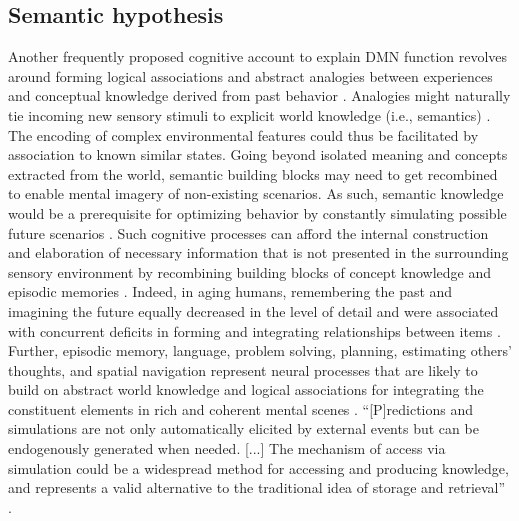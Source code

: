 \documentclass[10pt,letterpaper]{article}
\begin{document}
\subsection{Semantic hypothesis}
Another frequently proposed cognitive account to explain DMN function revolves
around forming logical associations and abstract analogies between
experiences and conceptual knowledge derived from past behavior
\citep{bar2007proactive, binder1999conceptual, constantinescu2016organizing}.
Analogies might naturally tie incoming new sensory stimuli to
explicit world knowledge (i.e., semantics)
\citep{bar2009proactive}.
The encoding of complex environmental features could thus be facilitated
by association to known similar states.
%
Going beyond isolated meaning and concepts extracted from the world,
semantic building blocks may need to get recombined to enable
mental imagery of non-existing scenarios.
As such, semantic knowledge would be a prerequisite for optimizing behavior
by constantly simulating possible future scenarios
\citep{boyer2008evolutionary, binder2011neurobiology}.
Such cognitive processes can afford
the internal construction and elaboration of necessary information
that is not presented in the surrounding sensory environment
by recombining building blocks of
concept knowledge and episodic memories
\citep{hassabis2009construction}.
Indeed, in aging humans, remembering the past and imagining the future
equally decreased in the level of detail and were associated with
concurrent deficits in forming and integrating relationships between
items \citep{addis2008age, spreng2006temporal}.
Further,
episodic memory, language, problem solving,
planning, estimating others' thoughts, and spatial navigation
represent neural processes that are likely to
build on abstract world knowledge and logical associations
for integrating the constituent elements in rich and coherent mental scenes
\citep{schacter2007remembering}.
``[P]redictions and simulations are not only automatically elicited by external events but can be endogenously generated when needed. [...] The mechanism of access via simulation could be a widespread method for accessing and producing knowledge, and represents a valid alternative to the traditional idea of storage and retrieval''
\citep{pezzulo2011grounding}.
\end{document}
